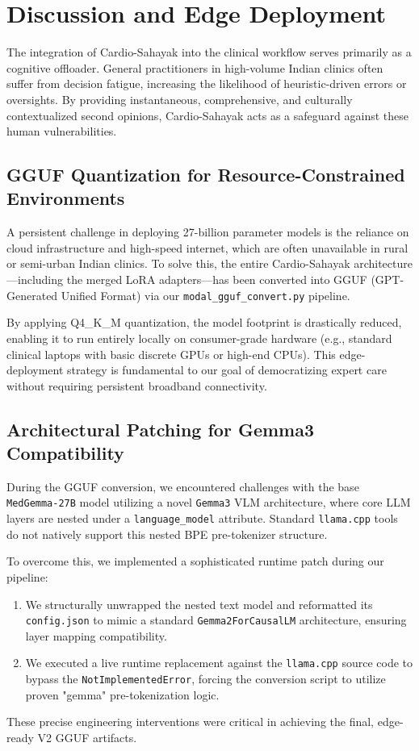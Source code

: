 \documentclass[11pt,a4paper]{article}
\begin{document}
\section{Discussion and Edge Deployment}

The integration of Cardio-Sahayak into the clinical workflow serves primarily as a cognitive offloader. General practitioners in high-volume Indian clinics often suffer from decision fatigue, increasing the likelihood of heuristic-driven errors or oversights. By providing instantaneous, comprehensive, and culturally contextualized second opinions, Cardio-Sahayak acts as a safeguard against these human vulnerabilities.

\subsection{GGUF Quantization for Resource-Constrained Environments}
A persistent challenge in deploying 27-billion parameter models is the reliance on cloud infrastructure and high-speed internet, which are often unavailable in rural or semi-urban Indian clinics. To solve this, the entire Cardio-Sahayak architecture---including the merged LoRA adapters---has been converted into GGUF (GPT-Generated Unified Format) via our \texttt{modal\_gguf\_convert.py} pipeline. 

By applying Q4\_K\_M quantization, the model footprint is drastically reduced, enabling it to run entirely locally on consumer-grade hardware (e.g., standard clinical laptops with basic discrete GPUs or high-end CPUs). This edge-deployment strategy is fundamental to our goal of democratizing expert care without requiring persistent broadband connectivity.

\subsection{Architectural Patching for Gemma3 Compatibility}
During the GGUF conversion, we encountered challenges with the base \texttt{MedGemma-27B} model utilizing a novel \texttt{Gemma3} VLM architecture, where core LLM layers are nested under a \texttt{language\_model} attribute. Standard \texttt{llama.cpp} tools do not natively support this nested BPE pre-tokenizer structure. 

To overcome this, we implemented a sophisticated runtime patch during our pipeline:
\begin{enumerate}
    \item We structurally unwrapped the nested text model and reformatted its \texttt{config.json} to mimic a standard \texttt{Gemma2ForCausalLM} architecture, ensuring layer mapping compatibility.
    \item We executed a live runtime replacement against the \texttt{llama.cpp} source code to bypass the \texttt{NotImplementedError}, forcing the conversion script to utilize proven "gemma" pre-tokenization logic.
\end{enumerate}
These precise engineering interventions were critical in achieving the final, edge-ready V2 GGUF artifacts.
\end{document}
